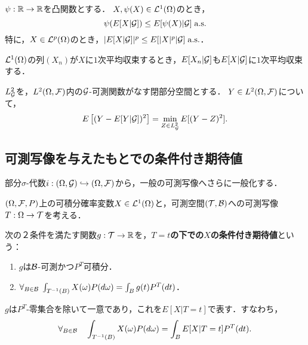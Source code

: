 \documentclass[uplatex,dvipdfmx]{jsreport}
\begin{document}
\begin{proposition}[Jensenの不等式]
    $\psi:\mathbb{R}\to\mathbb{R}$を凸関数とする．
    $X,\psi(X)\in\mathcal{L}^1(\Omega)$のとき，
    \[\psi(E[X|\mathcal{G}])\le E[\psi(X)|\mathcal{G}]\;\mathrm{a.s.}\]
    特に，$X\in\mathcal{L}^p(\Omega)$のとき，$\lvert E[X|\mathcal{G}]\rvert^p\le E[\lvert X\rvert^p|\mathcal{G}]\;\mathrm{a.s.}$．
\end{proposition}

\begin{proposition}[条件付き期待値の連続性]
    $\mathcal{L}^1(\Omega)$の列$(X_n)$が$X$に$1$次平均収束するとき，$E[X_n|\mathcal{G}]$も$E[X|\mathcal{G}]$に$1$次平均収束する．
\end{proposition}

\begin{theorem}[直交射影としての条件付き期待値]
    $L_{\mathcal{G}}^2$を，$L^2(\Omega,\mathcal{F})$内の$\mathcal{G}$-可測関数がなす閉部分空間とする．
    $Y\in L^2(\Omega,\mathcal{F})$について，
    \[E\left[(Y-E[Y|\mathcal{G}])^2\right]=\min_{Z\in L^2_{\mathcal{G}}}E[(Y-Z)^2].\]
\end{theorem}

\subsection{可測写像を与えたもとでの条件付き期待値}

\begin{tcolorbox}[colframe=ForestGreen, colback=ForestGreen!10!white,breakable,colbacktitle=ForestGreen!40!white,coltitle=black,fonttitle=\bfseries\sffamily,
title=]
    部分$\sigma$-代数$i:(\Omega,\mathcal{G})\hookrightarrow(\Omega,\mathcal{F})$から，一般の可測写像へさらに一般化する．
\end{tcolorbox}

\begin{notation}
    $(\Omega,\mathcal{F},P)$上の可積分確率変数$X\in\mathcal{L}^1(\Omega)$と，可測空間$(\mathcal{T},\mathcal{B})$への可測写像$T:\Omega\to\mathcal{T}$を考える．
\end{notation}

\begin{definition}
    次の２条件を満たす関数$g:\mathcal{T}\to\mathbb{R}$を，\textbf{$T=t$の下での$X$の条件付き期待値}という：
    \begin{enumerate}
        \item $g$は$\mathcal{B}$-可測かつ$P^T$可積分．
        \item $\forall_{B\in\mathcal{B}}\;\int_{T^{-1}(B)}X(\omega)P(d\omega)=\int_Bg(t)P^T(dt)$．
    \end{enumerate}
    $g$は$P^T$-零集合を除いて一意であり，これを$E[X|T=t]$で表す．すなわち，
    \[\forall_{B\in\mathcal{B}}\quad\int_{T^{-1}(B)}X(\omega)P(d\omega)=\int_BE[X|T=t]P^T(dt).\]
\end{definition}
\end{document}

